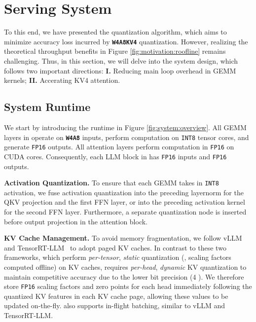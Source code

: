 \section{\system Serving System}
\label{sect:system}

To this end, we have presented the \algo quantization algorithm, which aims to minimize accuracy loss incurred by \textbf{\texttt{W4A8KV4}} quantization. However, realizing the theoretical throughput benefits in Figure \ref{fig:motivation:roofline} remains challenging. Thus, in this section, we will delve into the \system system design, which follows two important directions: \textbf{I.} Reducing main loop overhead in GEMM kernels; \textbf{II.} Accerating KV4 attention. %

\subsection{\system System Runtime}
\label{sect:system:runtime}


We start by introducing the \system runtime in Figure \ref{fig:system:overview}. All GEMM layers in \system operate on \textbf{\texttt{W4A8}} inputs, perform computation on \texttt{INT8} tensor cores, and generate \texttt{FP16} outputs. 
All attention layers perform computation in \texttt{FP16} on CUDA cores. Consequently, each LLM block in \system has \texttt{FP16} inputs and \texttt{FP16} outputs. 

\textbf{Activation Quantization.} To ensure that each GEMM takes in \texttt{INT8} activation, we fuse activation quantization into the preceding layernorm for the QKV projection and the first FFN layer, or into the preceding activation kernel for the second FFN layer. Furthermore, a separate quantization node is inserted before output projection in the attention block.

\textbf{KV Cache Management.} To avoid memory fragmentation, we follow vLLM~\cite{kwon2023efficient} and TensorRT-LLM~\cite{trtllm} to adopt paged KV caches. In contrast to these two frameworks, which perform \textit{per-tensor}, \textit{static} quantization (\ie, scaling factors computed offline) on KV caches, \system requires \textit{per-head}, \textit{dynamic} KV quantization to maintain competitive accuracy due to the lower bit precision (4 ). We therefore store \texttt{FP16} scaling factors and zero points for each head immediately following the quantized KV features in each KV cache page, allowing these values to be updated on-the-fly. \system also supports in-flight batching, similar to vLLM and TensorRT-LLM. %

